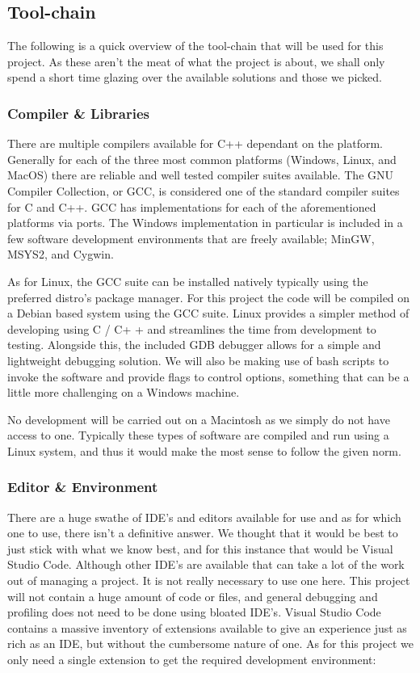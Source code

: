 \documentclass{article}
\begin{document}
\subsection{Tool-chain}
The following is a quick overview of the tool-chain that will be used for this project. As these aren't the meat of what the
project is about, we shall only spend a short time glazing over the available solutions and those we picked.

\subsubsection{Compiler \& Libraries}
There are multiple compilers available for C++ dependant on the platform. Generally for each of the three most common platforms
(Windows, Linux, and MacOS) there are reliable and well tested compiler suites available. The GNU Compiler Collection, or GCC, is
considered one of the standard compiler suites for C and C++. GCC has implementations for each of the aforementioned platforms
via ports. The Windows implementation in particular is included in a few software development environments that are freely
available; MinGW, MSYS2, and Cygwin.

As for Linux, the GCC suite can be installed natively typically using the preferred distro's package manager. For this project the
code will be compiled on a Debian based system using the GCC suite. Linux provides a simpler method of developing using C / C+
+ and streamlines the time from development to testing. Alongside this, the included GDB debugger allows for a simple and
lightweight debugging solution. We will also be making use of bash scripts to invoke the software and provide flags to control
options, something that can be a little more challenging on a Windows machine.

No development will be carried out on a Macintosh as we simply do not have access to one. Typically these types of software are
compiled and run using a Linux system, and thus it would make the most sense to follow the given norm.

\subsubsection{Editor \& Environment}
There are a huge swathe of IDE's and editors available for use and as for which one to use, there isn't a definitive answer. We
thought that it would be best to just stick with what we know best, and for this instance that would be Visual Studio Code.
Although other IDE's are available that can take a lot of the work out of managing a project. It is not really necessary to use
one here. This project will not contain a huge amount of code or files, and general debugging and profiling does not need to be
done using bloated IDE's. Visual Studio Code contains a massive inventory of extensions available to give an experience just as
rich as an IDE, but without the cumbersome nature of one. As for this project we only need a single extension to get the required
development environment:
\end{document}
